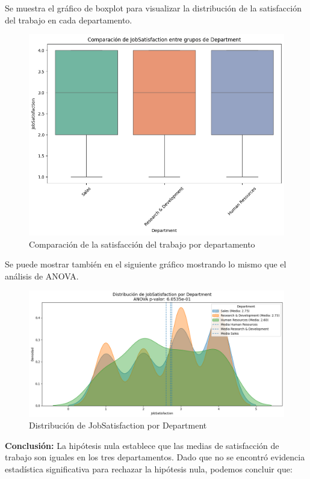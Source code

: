 Se muestra el gráfico de boxplot para visualizar la distribución de la satisfacción del trabajo en cada departamento.

\begin{figure}[H]
    \centering
    \includegraphics[width=1\textwidth]{images/boxplot-eje2.png}
    \caption{Comparación de la satisfacción del trabajo por departamento}
    \label{fig:anova}
\end{figure}


Se puede mostrar también en el siguiente gráfico mostrando lo mismo que el análisis de ANOVA. \cite{code}

\begin{figure}[H]
    \centering
    \includegraphics[width=1\textwidth]{images/sesgado-eje2.png}
    \caption{Distribución de JobSatisfaction por Department}
    \label{fig:anova-sesgado}
\end{figure}


\textbf{Conclusión:}
La hipótesis nula establece que las medias de satisfacción de trabajo son iguales en los tres departamentos. 
Dado que no se encontró evidencia estadística significativa para rechazar la hipótesis nula, podemos concluir que:

